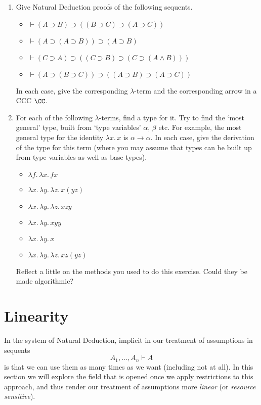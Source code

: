 \documentclass{svmult}
\begin{document}
\begin{enumerate}\renewcommand{\theenumi}{\textbf{\arabic{enumi}}}
  \item Give Natural Deduction proofs of the following sequents.
    \begin{itemize}
    \item $\vdash (A \supset B) \supset ((B \supset C) \supset (A \supset C))$
    \item $\vdash (A \supset (A \supset B)) \supset (A \supset B)$
    \item $\vdash (C \supset A) \supset ((C \supset B) \supset (C \supset (A \wedge B)))$
    \item $\vdash (A \supset (B \supset C)) \supset ((A \supset B) \supset (A \supset C))$
    \end{itemize}
    In each case, give the corresponding $\lambda$-term and the corresponding arrow in a CCC $\CC$.
  \item For each of the following $\lambda$-terms, find a type for it. Try to find the `most general' type, built from `type variables' $\alpha$,
    $\beta$ etc. For example, the most general type for the identity $\lambda x. \, x$ is $\alpha \rightarrow \alpha$.
    In each case, give the derivation of the type for this term (where you may assume that types can be
    built up from type variables as well as base types).
    \begin{itemize}
      \item $\lambda f.\, \lambda x. \, fx$
      \item $ \lambda x. \, \lambda y. \, \lambda z. \, x (yz)$
      \item $ \lambda x . \, \lambda y. \, \lambda z. \, x z y$
      \item $ \lambda x.\, \lambda y.\, x y y$
      \item $ \lambda x.\, \lambda y.\, x$
      \item $ \lambda x. \, \lambda y.\, \lambda z. \, xz (yz)$
    \end{itemize}
    Reflect a little on the methods you used to do this exercise. Could they be made algorithmic?
\end{enumerate}

\section{Linearity}
In the system of Natural Deduction, implicit in our treatment of assumptions in sequents
\[ A_{1}, \ldots , A_{n} \vdash A \]
is that we can use them as many times as we want (including not at all). In this section we will explore the field that is opened once we apply
restrictions to this approach, and thus render our treatment of assumptions more \emph{linear} (or \emph{resource sensitive}).
\end{document}
